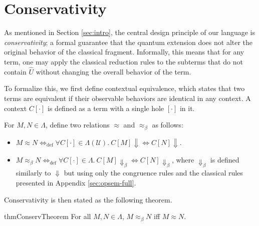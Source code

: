 \section{Conservativity}
As mentioned in Section \ref{sec:intro}, the central design principle of our language is \textit{conservativity}; a formal guarantee that the quantum extension does not alter the original behavior of the classical fragment.
Informally, this means that for any term, one may apply the classical reduction rules to the subterms that do not contain $\hat{U}$ without changing the overall behavior of the term.

To formalize this, we first define contextual equivalence, which states that two terms are equivalent if their observable behaviors are identical in any context.
A context $C[\cdot]$ is defined as a term with a single hole $[\cdot]$ in it.

\begin{dfn}
  For $M, N \in \Lambda$, define two relations $\approx$ and $\approx_\beta$ as follows:
  \begin{itemize}
    \item $M\approx N \Leftrightarrow_\mathrm{def} \forall C[\cdot]\in\Lambda(\mathcal{U}).\ C[M] \Downarrow \Leftrightarrow C[N] \Downarrow$.
    \item $M\approx_\beta N \Leftrightarrow_\mathrm{def} \forall C[\cdot]\in\Lambda.\ C[M] \Downarrow_\beta \Leftrightarrow C[N] \Downarrow_\beta$, where $\Downarrow_\beta$ is defined similarly to $\Downarrow$ but using only the congruence rules and the classical rules presented in Appendix \ref{sec:opsem-full}.
  \end{itemize}
\end{dfn}

Conservativity is then stated as the following theorem.
\begin{restatable}[Conservativity]{thm}{ConservTheorem} \label{thm:conservativity}
  For all $M, N \in \Lambda$, $M \approx_\beta N$ iff $M \approx N$.
\end{restatable}
